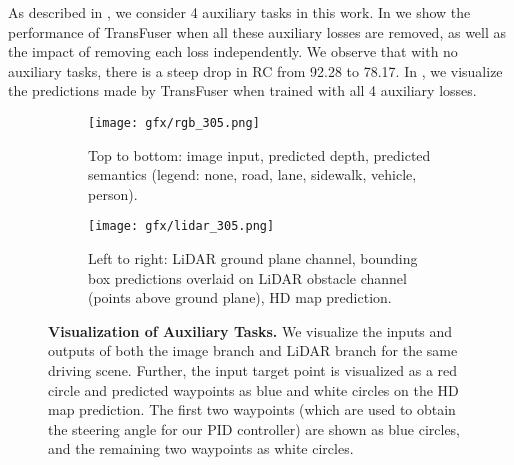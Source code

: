  As described in , we consider 4 auxiliary tasks in this work. In  we show the performance of TransFuser when all these auxiliary losses are removed, as well as the impact of removing each loss independently. We observe that with no auxiliary tasks, there is a steep drop in RC from 92.28 to 78.17.  In , we visualize the predictions made by TransFuser when trained with all 4 auxiliary losses.

\begin{figure}
    \begin{subfigure}[b]{0.48\textwidth}
        \centering
        \texttt{[image: gfx/rgb\_305.png]}
        \caption{Top to bottom: image input, predicted depth, predicted semantics (legend: {\color{color_unlabled}none}, {\color{color_road}road}, {\color{color_roadline}lane}, {\color{color_sidewalk}sidewalk}, {\color{color_vehicle}vehicle}, {\color{color_person}person}).}
        \label{fig:qual1}
    \end{subfigure}
    \hfill
    \vspace{0.15cm}
    \begin{subfigure}[b]{0.48\textwidth}
        \centering
        \texttt{[image: gfx/lidar\_305.png]}
        \caption{Left to right: LiDAR ground plane channel, bounding box predictions overlaid on LiDAR obstacle channel (points above ground plane), HD map prediction.}
        \label{fig:qual2}
    \end{subfigure}
    \vspace{0.0cm}
    \caption{\label{fig:qual}\textbf{Visualization of Auxiliary Tasks.} We visualize the inputs and outputs of both the image branch and LiDAR branch for the same driving scene. Further, the input target point is visualized as a red circle and predicted waypoints as blue and white circles on the HD map prediction. The first two waypoints (which are used to obtain the steering angle for our PID controller) are shown as blue circles, and the remaining two waypoints as white circles.}
\end{figure}

